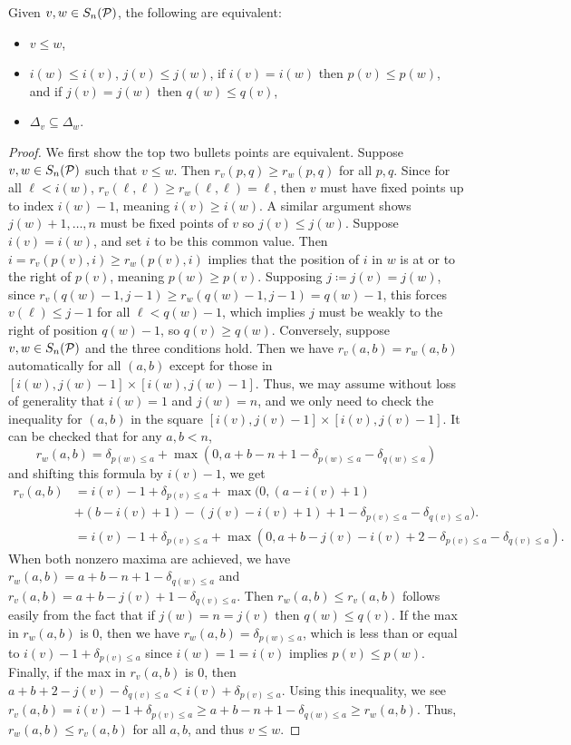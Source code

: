 \begin{proposition}
\label{prop:Inclusion}
    Given $v,w\in S_n(\mathcal{P})$, the following are equivalent:
    \begin{itemize}
        \item $v\leq w$,
        \item $i(w) \leq i(v)$, $j(v)\leq j(w)$, if $i(v)=i(w)$ then $p(v)\leq p(w)$, and if $j(v)=j(w)$ then $q(w) \leq q(v)$,
        \item $\Delta_v\subseteq \Delta_w$.
    \end{itemize}
\end{proposition}
\begin{proof}
    We first show the top two bullets points are equivalent. Suppose $v,w\in S_n(\mathcal{P})$ such that $v\leq w$. Then $r_v(p,q) \geq r_w(p,q)$ for all $p,q$. Since for all $\ell<i(w)$, $r_v(\ell,\ell)\geq r_w(\ell,\ell) = \ell$, then $v$ must have fixed points up to index $i(w)-1$, meaning $i(v)\geq i(w)$. A similar argument shows $j(w)+1,\dots,n$ must be fixed points of $v$ so $j(v)\leq j(w)$.
    Suppose $i(v)=i(w)$, and set $i$ to be this common value. Then $i=r_v(p(v),i) \geq r_w(p(v),i)$ implies that the position of $i$ in $w$ is at or to the right of $p(v)$, meaning $p(w) \geq p(v)$. Supposing $j\coloneqq j(v)=j(w)$, since $r_v(q(w)-1,j-1)\geq r_w(q(w)-1,j-1) = q(w)-1$, this forces $v(\ell)\leq j-1$ for all $\ell<q(w)-1$, which implies $j$ must be weakly to the right of position $q(w)-1$, so $q(v)\geq q(w)$.
    Conversely, suppose $v,w\in S_n(\mathcal{P})$ and the three conditions hold. Then we have $r_v(a,b)= r_w(a,b)$ automatically for all $(a,b)$ except for those in $[i(w),j(w)-1]\times [i(w),j(w)-1]$. Thus, we may assume without loss of generality that $i(w)=1$ and $j(w)=n$, and we only need to check the inequality for $(a,b)$ in the square $[i(v),j(v)-1]\times [i(v),j(v)-1]$.
    It can be checked that for any $a,b<n$, 
    \[
    r_w(a,b) = \delta_{p(w)\leq a} + \max(0,a+b-n+1-\delta_{p(w)\leq a} - \delta_{q(w)\leq a})
    \]
    and shifting this formula by $i(v)-1$, we get
    \begin{align*}
    r_v(a,b) 
    & = i(v)-1 + \delta_{p(v)\leq a} + \max(0,(a-i(v)+1) \\ 
    & + (b-i(v)+1) - (j(v)-i(v)+1)+1 - \delta_{p(v)\leq a} - \delta_{q(v)\leq a}).\\
    &= i(v)-1 + \delta_{p(v)\leq a} + \max(0,a+b-j(v)-i(v)+2 - \delta_{p(v)\leq a} - \delta_{q(v)\leq a}).
    \end{align*}
    When both nonzero maxima are achieved, we have $r_w(a,b) = a+b-n+1-\delta_{q(w)\leq a}$ and $r_v(a,b) = a+b-j(v)+1-\delta_{q(v)\leq a}$. Then $r_w(a,b)\leq r_v(a,b)$ follows easily from the fact that if $j(w)=n=j(v)$ then $q(w)\leq q(v)$. If the max in $r_w(a,b)$ is $0$, then we have $r_w(a,b) = \delta_{p(w)\leq a}$, which is less than or equal to $i(v)-1+\delta_{p(v)\leq a}$ since $i(w)=1=i(v)$ implies $p(v)\leq p(w)$. Finally, if the max in $r_v(a,b)$ is $0$, then $a+b+2-j(v)-\delta_{q(v)\leq a}<i(v) + \delta_{p(v)\leq a}$. Using this inequality, we see $r_v(a,b) = i(v)-1+\delta_{p(v)\leq a} \geq a+b-n+1-\delta_{q(w)\leq a} \geq r_w(a,b)$. Thus, $r_w(a,b)\leq r_v(a,b)$ for all $a,b$, and thus $v\leq w$.
    

\end{proof}
